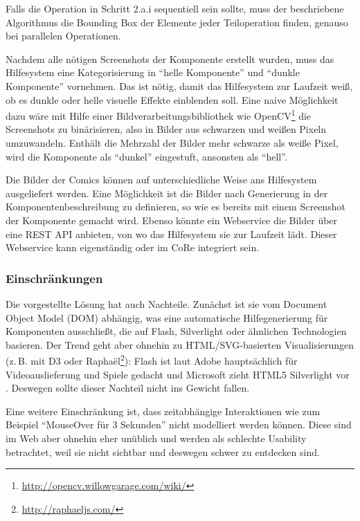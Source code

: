 \documentclass[
	headsepline,
	footsepline,
	fontsize=12pt,
	bibliography=totoc
]{scrbook}
\begin{document}
Falls die Operation in Schritt 2.a.i sequentiell sein sollte, muss der beschriebene Algorithmus die Bounding Box der Elemente jeder Teiloperation finden, genauso bei parallelen Operationen.


Nachdem alle nötigen Screenshots der Komponente erstellt wurden, muss das Hilfesystem eine Kategorisierung in \enquote{helle Komponente} und \enquote{dunkle Komponente} vornehmen. Das ist nötig, damit das Hilfesystem zur Laufzeit weiß, ob es dunkle oder helle visuelle Effekte einblenden soll. Eine naive Möglichkeit dazu wäre mit Hilfe einer Bildverarbeitungsbibliothek wie OpenCV\footnote{\url{http://opencv.willowgarage.com/wiki/}} die Screenshots zu binärisieren, also in Bilder aus schwarzen und weißen Pixeln umzuwandeln. Enthält die Mehrzahl der Bilder mehr schwarze als weiße Pixel, wird die Komponente als \enquote{dunkel} eingestuft, ansonsten als \enquote{hell}.

Die Bilder der Comics können auf unterschiedliche Weise ans Hilfesystem ausgeliefert werden. Eine Möglichkeit ist die Bilder nach Generierung in der Komponentenbeschreibung zu definieren, so wie es bereits mit einem Screenshot der Komponente gemacht wird. Ebenso könnte ein Webservice die Bilder über eine REST API anbieten, von wo das Hilfesystem sie zur Laufzeit lädt. Dieser Webservice kann eigenständig oder im CoRe integriert sein.

\subsubsection{Einschränkungen}
\label{section:konzeption:bedienung:generierung:einschraenkungen}


Die vorgestellte Lösung hat auch Nachteile. Zunächst ist sie vom Document Object Model (DOM) abhängig, was eine automatische Hilfegenerierung für Komponenten ausschließt, die auf Flash, Silverlight oder ähnlichen Technologien basieren. Der Trend geht aber ohnehin zu HTML/SVG-basierten Visualisierungen (z.\,B. mit D3 \cite{Bostock2011} oder Raphaël\footnote{\url{http://raphaeljs.com/}}): Flash ist laut Adobe hauptsächlich für Videoauslieferung und Spiele gedacht \cite{Adobe2013} und Microsoft zieht HTML5 Silverlight vor \cite{Foley2010}. Deswegen sollte dieser Nachteil nicht ins Gewicht fallen.

Eine weitere Einschränkung ist, dass zeitabhängige Interaktionen wie zum Beispiel \enquote{MouseOver für 3 Sekunden} nicht modelliert werden können. Diese sind im Web aber ohnehin eher unüblich und werden als schlechte Usability betrachtet, weil sie nicht sichtbar und deswegen schwer zu entdecken sind.
\end{document}
